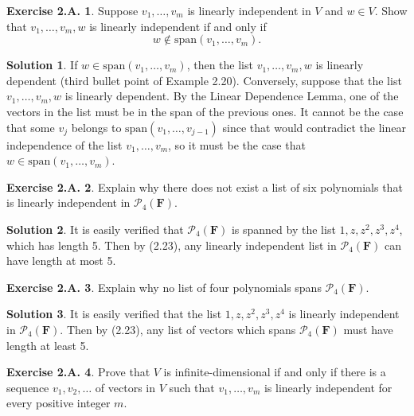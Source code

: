 \documentclass[12pt]{article}
\theoremstyle{definition}
\theoremstyle{exercise}
\newtheorem{exercise}{Exercise 2.A.}
\theoremstyle{solution}
\newtheorem*{solution}{Solution}
\newcommand{\Span}{\text{span}}
\newcommand{\F}{\mathbf{F}}
\begin{document}
\begin{exercise}
\label{ex:11}
    Suppose \( v_1, \ldots, v_m \) is linearly independent in \( V \) and \( w \in V \). Show that \( v_1, \ldots, v_m, w \) is linearly independent if and only if
    \[
        w \not\in \Span (v_1, \ldots, v_m).
    \]
\end{exercise}

\begin{solution}
    If \( w \in \Span (v_1, \ldots, v_m) \), then the list \( v_1, \ldots, v_m, w \) is linearly dependent (third bullet point of Example 2.20). Conversely, suppose that the list \( v_1, \ldots, v_m, w \) is linearly dependent. By the Linear Dependence Lemma, one of the vectors in the list must be in the span of the previous ones. It cannot be the case that some \( v_j \) belongs to \( \Span (v_1, \ldots, v_{j-1}) \) since that would contradict the linear independence of the list \( v_1, \ldots, v_m \), so it must be the case that \( w \in \Span (v_1, \ldots, v_m) \).
\end{solution}

\begin{exercise}
\label{ex:12}
    Explain why there does not exist a list of six polynomials that is linearly independent in \( \mathcal{P}_4 (\F) \).
\end{exercise}

\begin{solution}
    It is easily verified that \( \mathcal{P}_4 (\F) \) is spanned by the list \( 1, z, z^2, z^3, z^4 \), which has length 5. Then by (2.23), any linearly independent list in \( \mathcal{P}_4 (\F) \) can have length at most 5.
\end{solution}

\begin{exercise}
\label{ex:13}
    Explain why no list of four polynomials spans \( \mathcal{P}_4 (\F) \).
\end{exercise}

\begin{solution}
    It is easily verified that the list \( 1, z, z^2, z^3, z^4 \) is linearly independent in \( \mathcal{P}_4 (\F) \). Then by (2.23), any list of vectors which spans \( \mathcal{P}_4 (\F) \) must have length at least 5.
\end{solution}

\begin{exercise}
\label{ex:14}
    Prove that \( V \) is infinite-dimensional if and only if there is a sequence \( v_1, v_2, \ldots \) of vectors in \( V \) such that \( v_1, \ldots, v_m \) is linearly independent for every positive integer \( m \).
\end{exercise}
\end{document}
